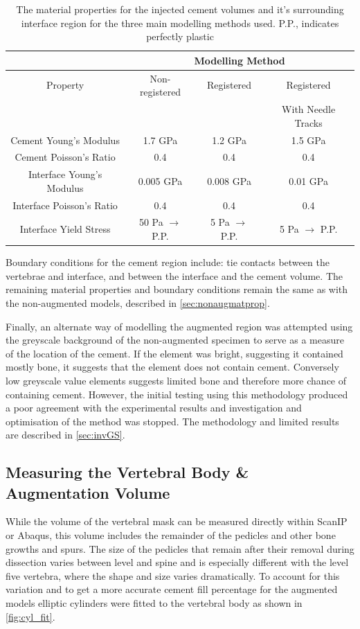 \begin{table}[h]
\centering
\caption{The material properties for the injected cement volumes and it's
	surrounding interface region for the three main modelling methods
used. P.P., indicates perfectly plastic}
\label{tab:matprops4cmt}
\begin{tabular}{c|c|c|c}
               & \multicolumn{3}{c}{Modelling Method}				\\
	\hline 
	Property	       & Non-registered & Registered & Registered  \\ 
			       &		&	     & With Needle
	Tracks \\ \hline \hline
Cement Young's Modulus    &1.7 GPa            & 1.2 GPa       & 1.5 GPa \\
Cement Poisson's Ratio    &0.4                & 0.4           &0.4  \\ \hline
Interface Young's Modulus & 0.005 GPa          & 0.008 GPa      &0.01 GPa \\ 
Interface Poisson's Ratio & 0.4               & 0.4           & 0.4\\ 
Interface Yield Stress	  & 50 Pa $\rightarrow$ P.P.      & 5 Pa $\rightarrow$
P.P.  & 5 Pa $\rightarrow$ P.P.
\\ \hline
\end{tabular}
\end{table}

Boundary conditions for the cement region include: tie contacts between the
vertebrae and interface, and between the interface and the cement volume.
The remaining material properties and boundary conditions remain the same as
with the non-augmented models, described in \cref{sec:nonaugmatprop}.

Finally, an alternate way of modelling the augmented region was attempted using
the greyscale background of the non-augmented specimen to serve as a measure of
the location of the cement. If the element was bright, suggesting it contained
mostly bone, it suggests that the element does not contain cement. Conversely
low greyscale value elements suggests limited bone and therefore more chance of
containing cement. However, the initial testing using this methodology produced
a poor agreement with the experimental results and investigation and
optimisation of the method was stopped. The methodology and limited results are
described in \cref{sec:invGS}.

\subsection{Measuring the Vertebral Body \& Augmentation Volume}
\label{sec:measure}
While the volume of the vertebral mask can be measured directly within ScanIP
or Abaqus, this volume includes the remainder of the pedicles and other bone growths and spurs.
The size of the pedicles that remain after their removal during dissection
varies between level and spine and is especially different with the level five
vertebra, where the shape and size varies dramatically.
To account for this variation and to get a more accurate cement fill percentage
for the augmented models elliptic cylinders were fitted to the vertebral body
as shown in \cref{fig:cyl_fit}.




